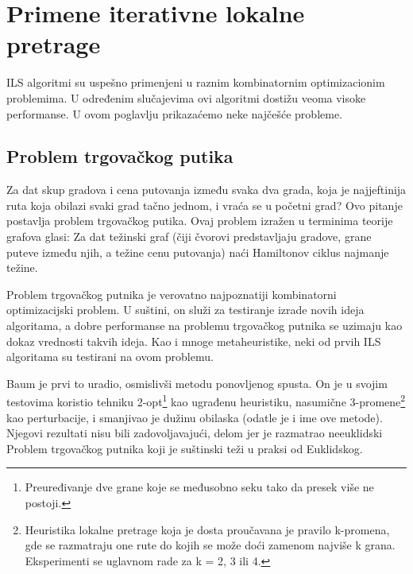 \documentclass[a4paper]{article}
\begin{document}


\section{Primene iterativne lokalne pretrage}
ILS algoritmi su uspešno primenjeni u raznim kombinatornim optimizacionim problemima. U određenim slučajevima ovi algoritmi dostižu veoma visoke performanse. U ovom poglavlju prikazaćemo neke najčešće probleme.
\subsection{Problem trgovačkog putika}
Za dat skup gradova i cena putovanja između svaka dva grada, koja je najjeftinija ruta koja obilazi svaki grad tačno jednom, i vraća se u početni grad? Ovo pitanje postavlja problem trgovačkog putika. Ovaj problem izražen u terminima teorije grafova glasi: Za dat težinski graf (čiji čvorovi predstavljaju gradove, grane puteve između njih, a težine cenu putovanja) naći Hamiltonov ciklus najmanje težine.

Problem trgovačkog putnika je verovatno najpoznatiji kombinatorni optimizacijski problem. U suštini, on služi za testiranje izrade novih ideja algoritama, a dobre performanse na problemu trgovačkog putnika se uzimaju kao dokaz vrednosti takvih ideja. Kao i mnoge metaheuristike, neki od prvih ILS algoritama su testirani na ovom problemu. 

Baum je prvi to uradio, osmislivši metodu ponovljenog spusta. On je u svojim testovima koristio tehniku 2-opt\footnote{Preuređivanje dve grane koje se međusobno seku tako da presek više ne postoji.} kao ugrađenu heuristiku, nasumične 3-promene\footnote{Heuristika lokalne pretrage koja je dosta proučavana je pravilo k-promena, gde se razmatraju one rute do kojih se može doći zamenom najviše k grana. Eksperimenti se uglavnom rade za k = 2, 3 ili 4.} kao perturbacije, i smanjivao je dužinu obilaska (odatle je i ime ove metode). Njegovi rezultati nisu bili zadovoljavajući, delom jer je razmatrao neeuklidski Problem trgovačkog putnika koji je suštinski teži u praksi od Euklidskog.
\end{document}
